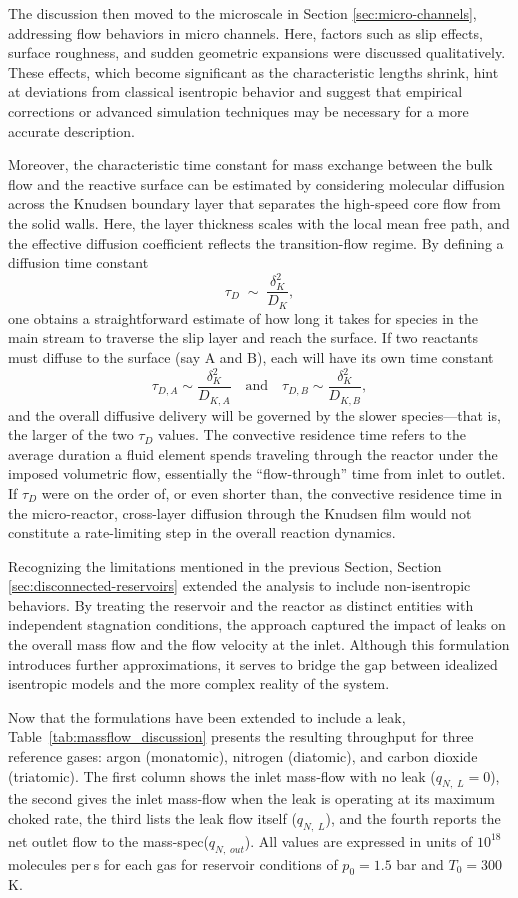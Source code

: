 The discussion then moved to the microscale in Section \ref{sec:micro-channels}, addressing flow behaviors in micro channels.
Here, factors such as slip effects, surface roughness, and sudden geometric expansions were discussed qualitatively.
These effects, which become significant as the characteristic lengths shrink, hint at deviations from classical isentropic behavior and suggest that empirical corrections or advanced simulation techniques may be necessary for a more accurate description.

Moreover, the characteristic time constant for mass exchange between the bulk flow and the reactive surface can be estimated by considering molecular diffusion across the Knudsen boundary layer that separates the high-speed core flow from the solid walls.
Here, the layer thickness scales with the local mean free path, and the effective diffusion coefficient reflects the transition-flow regime.
By defining a diffusion time constant
$$
	\tau_{D}\;\sim\;\frac{\delta_{K}^{2}}{D_{K}},
$$
one obtains a straightforward estimate of how long it takes for species in the main stream to traverse the slip layer and reach the surface.
If two reactants must diffuse to the surface (say A and B), each will have its own time constant
$$
	\tau_{D,A}\sim\frac{\delta_{K}^{2}}{D_{K,A}}
	\quad\text{and}\quad
	\tau_{D,B}\sim\frac{\delta_{K}^{2}}{D_{K,B}},
$$
and the overall diffusive delivery will be governed by the slower species—that is, the larger of the two $\tau_{D}$ values.
The convective residence time refers to the average duration a fluid element spends traveling through the reactor under the imposed volumetric flow, essentially the “flow-through” time from inlet to outlet.
If $\tau_{D}$ were on the order of, or even shorter than, the convective residence time in the micro-reactor, cross-layer diffusion through the Knudsen film would not constitute a rate-limiting step in the overall reaction dynamics.

Recognizing the limitations mentioned in the previous Section, Section \ref{sec:disconnected-reservoirs} extended the analysis to include non-isentropic behaviors.
By treating the reservoir and the reactor as distinct entities with independent stagnation conditions, the approach captured the impact of leaks on the overall mass flow and the flow velocity at the inlet.
Although this formulation introduces further approximations, it serves to bridge the gap between idealized isentropic models and the more complex reality of the system.

Now that the formulations have been extended to include a leak, Table~\ref{tab:massflow_discussion} presents the resulting throughput for three reference gases: argon (monatomic), nitrogen (diatomic), and carbon dioxide (triatomic).
The first column shows the inlet mass‐flow with no leak ($q_{N,\;L}=0$), the second gives the inlet mass‐flow when the leak is operating at its maximum choked rate, the third lists the leak flow itself ($q_{N,\;L}$), and the fourth reports the net outlet flow to the mass-spec($q_{N,\;out}$).
All values are expressed in units of $10^{18}$ molecules per s for each gas for reservoir conditions of $p_0 = 1.5$ bar and $T_0 = 300$ K.

